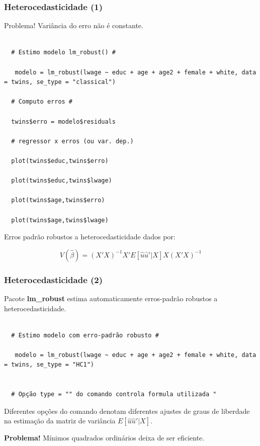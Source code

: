 \documentclass[10pt,slides,xcolor=pdftex,dvipsnames,table]{beamer}
\begin{document}
\begin{frame}[fragile]
	\frametitle{Heterocedasticidade (1)}

\vspace{0.3cm}
Problema! Variância do erro não é constante.

\begin{lstlisting}

  # Estimo modelo lm_robust() # 
    
   modelo = lm_robust(lwage ~ educ + age + age2 + female + white, data = twins, se_type = "classical")    
   
  # Computo erros # 
   
  twins$erro = modelo$residuals 
  
  # regressor x erros (ou var. dep.) 
  
  plot(twins$educ,twins$erro)  
  
  plot(twins$educ,twins$lwage)
	
  plot(twins$age,twins$erro)  
  
  plot(twins$age,twins$lwage)	

\end{lstlisting}

Erros padrão robustos a heterocedasticidade dados por:

$$ V \left( \widehat{\beta} \right) = (X'X)^{-1} X' E[\hat{u} \hat{u}' | X] X (X'X)^{-1} $$ 

\end{frame}


\begin{frame}[fragile]
	\frametitle{Heterocedasticidade (2)}

\vspace{0.3cm}
Pacote \textbf{lm\_robust} estima automaticamente erros-padrão robustos a heterocedasticidade.

\begin{lstlisting}

  # Estimo modelo com erro-padrão robusto # 
    
   modelo = lm_robust(lwage ~ educ + age + age2 + female + white, data = twins, se_type = "HC1")    
  
  
  # Opção type = "" do comando controla formula utilizada "

\end{lstlisting}

Diferentes opções do comando denotam diferentes ajustes de graus de liberdade na estimação da matriz de variância $E[\hat{u} \hat{u}' | X]$.

\vspace*{0.2cm}

\textbf{Problema!} Mínimos quadrados ordinários deixa de ser eficiente.

\end{frame}
\end{document}
